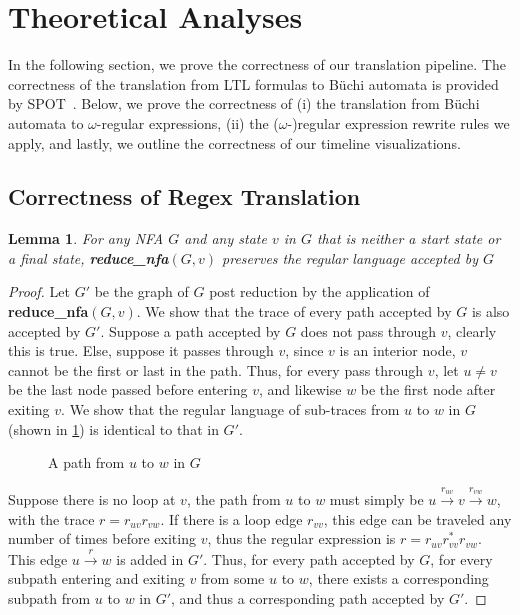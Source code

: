 \documentclass[conference]{IEEEtran}
\newtheorem{lemma}{Lemma}[section]
\theoremstyle{definition}
\theoremstyle{remark}
\newcommand{\Buchi}{B\"{u}chi }
\begin{document}
\section{Theoretical Analyses} \label{sec:analysis}
In the following section, we prove the correctness of our translation pipeline. The correctness of the translation from LTL formulas to \Buchi automata is provided by SPOT~\cite{Dur22}. Below, we prove the correctness of (i) the translation from \Buchi automata to $\omega$-regular expressions, (ii) the ($\omega$-)regular expression rewrite rules we apply, and lastly, we outline the correctness of our timeline visualizations.
\subsection{Correctness of Regex Translation}
\begin{lemma}
    For any NFA $G$ and any state $v$ in $G$ that is neither a start state or a final state, \textbf{reduce\_nfa}$(G, v)$ preserves the regular language accepted by $G$
\end{lemma}
\begin{proof}
    Let $G'$ be the graph of $G$ post reduction by the application of \textbf{reduce\_nfa}$(G, v)$. We show that the trace of every path accepted by $G$ is also accepted by $G'$. Suppose a path accepted by $G$ does not pass through $v$, clearly this is true. Else, suppose it passes through $v$, since $v$ is an interior node, $v$ cannot be the first or last in the path. Thus, for every pass through $v$, let $u\neq v$ be the last node passed before entering $v$, and likewise $w$ be the first node after exiting $v$. We show that the regular language of sub-traces from $u$ to $w$ in $G$ (shown in \cref{fig:uvw-dfa}) is identical to that in $G'$.
    \begin{figure}[h!]
        \centering
        \caption{A path from $u$ to $w$ in $G$}
        \label{fig:uvw-dfa}
    \end{figure}
    Suppose there is no loop at $v$, the path from $u$ to $w$ must simply be $u\xrightarrow{r_{uv}}v\xrightarrow{r_{vw}}w$, with the trace $r=r_{uv}r_{vw}$. If there is a loop edge $r_{vv}$, this edge can be traveled any number of times before exiting $v$, thus the regular expression is $r=r_{uv}r_{vv}^*r_{vw}$. This edge $u\xrightarrow{r}w$ is added in $G'$. Thus, for every path accepted by $G$, for every subpath entering and exiting $v$ from some $u$ to $w$, there exists a corresponding subpath from $u$ to $w$ in $G'$, and thus a corresponding path accepted by $G'$.
\end{proof}
\end{document}

